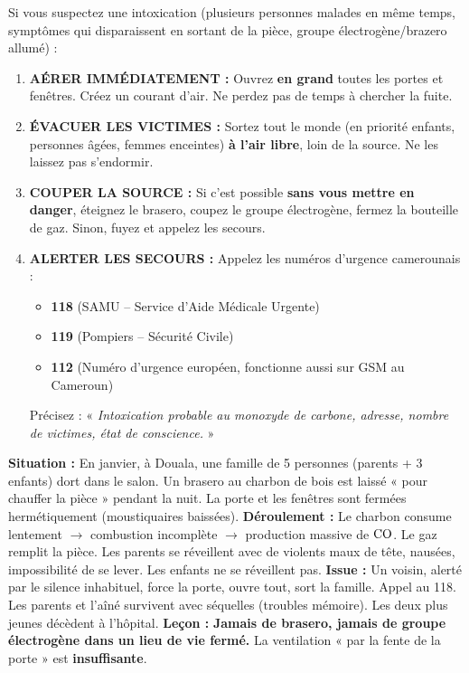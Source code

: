 \documentclass[11pt]{article}
\begin{document}
\begin{methode}
Si vous suspectez une intoxication (plusieurs personnes malades en même temps, symptômes qui disparaissent en sortant de la pièce, groupe électrogène/brazero allumé) :
\begin{enumerate}
    \item \textbf{AÉRER IMMÉDIATEMENT :} Ouvrez \textbf{en grand} toutes les portes et fenêtres. Créez un courant d'air. Ne perdez pas de temps à chercher la fuite.
    \item \textbf{ÉVACUER LES VICTIMES :} Sortez tout le monde (en priorité enfants, personnes âgées, femmes enceintes) \textbf{à l'air libre}, loin de la source. Ne les laissez pas s'endormir.
    \item \textbf{COUPER LA SOURCE :} Si c'est possible \textbf{sans vous mettre en danger}, éteignez le brasero, coupez le groupe électrogène, fermez la bouteille de gaz. Sinon, fuyez et appelez les secours.
    \item \textbf{ALERTER LES SECOURS :} Appelez les numéros d'urgence camerounais :
    \begin{itemize}
        \item \textbf{118} (SAMU -- Service d'Aide Médicale Urgente)
        \item \textbf{119} (Pompiers -- Sécurité Civile)
        \item \textbf{112} (Numéro d'urgence européen, fonctionne aussi sur GSM au Cameroun)
    \end{itemize}
    Précisez : « \emph{Intoxication probable au monoxyde de carbone, adresse, nombre de victimes, état de conscience.} »
\end{enumerate}
\end{methode}

\begin{exemplebox}
\textbf{Situation :} En janvier, à Douala, une famille de 5 personnes (parents + 3 enfants) dort dans le salon. Un brasero au charbon de bois est laissé « pour chauffer la pièce » pendant la nuit. La porte et les fenêtres sont fermées hermétiquement (moustiquaires baissées).
\textbf{Déroulement :} Le charbon consume lentement $\rightarrow$ combustion incomplète $\rightarrow$ production massive de $\ce{CO}$. Le gaz remplit la pièce. Les parents se réveillent avec de violents maux de tête, nausées, impossibilité de se lever. Les enfants ne se réveillent pas.
\textbf{Issue :} Un voisin, alerté par le silence inhabituel, force la porte, ouvre tout, sort la famille. Appel au 118. Les parents et l'aîné survivent avec séquelles (troubles mémoire). Les deux plus jeunes décèdent à l'hôpital.
\textbf{Leçon :} \textbf{Jamais de brasero, jamais de groupe électrogène dans un lieu de vie fermé.} La ventilation « par la fente de la porte » est \textbf{insuffisante}.
\end{exemplebox}
\end{document}
